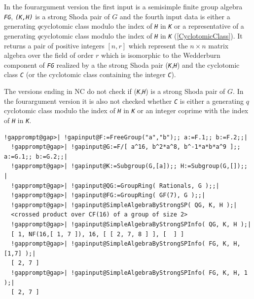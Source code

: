 \documentclass[a4paper,11pt]{report}
\begin{document}
{{{ In the four\texttt{}argument version the first input is a
semisimple finite group algebra \mbox{\texttt{\mdseries\slshape FG}}, \mbox{\texttt{\mdseries\slshape (K,H)}} is a strong Shoda pair of $G$ and the fourth input data is either a generating $q$\texttt{}cyclotomic class modulo the index of \mbox{\texttt{\mdseries\slshape H}} in \mbox{\texttt{\mdseries\slshape K}} or a representative of a generating $q$\texttt{}cyclotomic class modulo the index of \mbox{\texttt{\mdseries\slshape H}} in \mbox{\texttt{\mdseries\slshape K}} (\ref{CyclotomicClass}). It returns a pair of positive integers $[n,r]$ which represent the $n\times n$ matrix algebra over the field of order $r$ which is isomorphic to the Wedderburn component of \mbox{\texttt{\mdseries\slshape FG}} realized by a the strong Shoda pair (\mbox{\texttt{\mdseries\slshape K}},\mbox{\texttt{\mdseries\slshape H}}) and the cyclotomic class \mbox{\texttt{\mdseries\slshape C}} (or the cyclotomic class containing the integer \mbox{\texttt{\mdseries\slshape C}}). 

 The versions ending in NC do not check if (\mbox{\texttt{\mdseries\slshape K}},\mbox{\texttt{\mdseries\slshape H}}) is a strong Shoda pair of $G$. In the four\texttt{}argument version it is also not checked
whether \mbox{\texttt{\mdseries\slshape C}} is either a generating $q$\texttt{}cyclotomic class modulo the index of \mbox{\texttt{\mdseries\slshape H}} in \mbox{\texttt{\mdseries\slshape K}} or an integer coprime with the index of \mbox{\texttt{\mdseries\slshape H}} in \mbox{\texttt{\mdseries\slshape K}}. 
\begin{Verbatim}[commandchars=!@|,fontsize=\small,frame=single,label=Example]
  !gapprompt@gap>| !gapinput@F:=FreeGroup("a","b");; a:=F.1;; b:=F.2;;|
  !gapprompt@gap>| !gapinput@G:=F/[ a^16, b^2*a^8, b^-1*a*b*a^9 ];; a:=G.1;; b:=G.2;;|
  !gapprompt@gap>| !gapinput@K:=Subgroup(G,[a]);; H:=Subgroup(G,[]);; |
  !gapprompt@gap>| !gapinput@QG:=GroupRing( Rationals, G );;|
  !gapprompt@gap>| !gapinput@FG:=GroupRing( GF(7), G );;|
  !gapprompt@gap>| !gapinput@SimpleAlgebraByStrongSP( QG, K, H );|
  <crossed product over CF(16) of a group of size 2>
  !gapprompt@gap>| !gapinput@SimpleAlgebraByStrongSPInfo( QG, K, H );|
  [ 1, NF(16,[ 1, 7 ]), 16, [ [ 2, 7, 8 ] ], [  ] ]
  !gapprompt@gap>| !gapinput@SimpleAlgebraByStrongSPInfo( FG, K, H, [1,7] );|
  [ 2, 7 ]
  !gapprompt@gap>| !gapinput@SimpleAlgebraByStrongSPInfo( FG, K, H, 1 );|
  [ 2, 7 ]
\end{Verbatim}
 }

 }

 }
\end{document}
